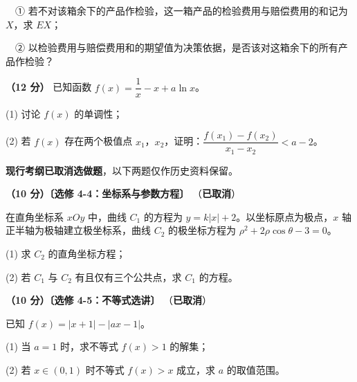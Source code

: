   　① 若不对该箱余下的产品作检验，这一箱产品的检验费用与赔偿费用的和记为 $X$，求 $EX$；

  　② 以检验费用与赔偿费用和的期望值为决策依据，是否该对这箱余下的所有产品作检验？

\textbf{（12 分）} 已知函数 $f(x)=\dfrac1x-x+a\ln x$。

  (1) 讨论 $f(x)$ 的单调性；

  (2) 若 $f(x)$ 存在两个极值点 $x_1$，$x_2$，证明：$\dfrac{f\left(x_1\right)-f\left(x_2\right)}{x_1-x_2}<a-2$。

\par\medskip


\begin{gktip}
\textbf{ 现行考纲已取消选做题}，以下两题仅作历史资料保留。
\end{gktip}

\textbf{（10 分）〔选修 4-4：坐标系与参数方程〕} （\textbf{已取消}）

在直角坐标系 $xOy$ 中，曲线 $C_1$ 的方程为 $y=k|x|+2$。以坐标原点为极点，$x$ 轴正半轴为极轴建立极坐标系，曲线 $C_2$ 的极坐标方程为 $\rho^{2}+2\rho\cos\theta-3=0$。

  (1) 求 $C_2$ 的直角坐标方程；

  (2) 若 $C_1$ 与 $C_2$ 有且仅有三个公共点，求 $C_1$ 的方程。

\textbf{（10 分）〔选修 4-5：不等式选讲〕} （\textbf{已取消}）

已知 $f(x)=|x+1|-|ax-1|$。

  (1) 当 $a=1$ 时，求不等式 $f(x)>1$ 的解集；

  (2) 若 $x\in(0,1)$ 时不等式 $f(x)>x$ 成立，求 $a$ 的取值范围。

\par\medskip

